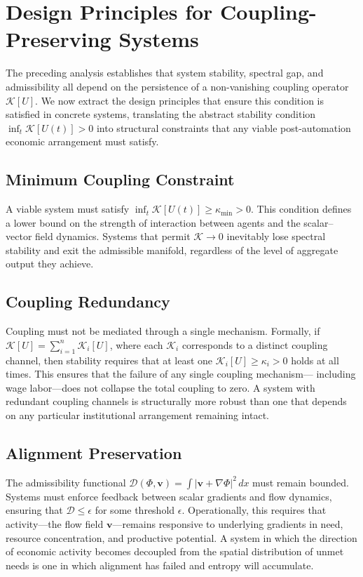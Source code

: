 \documentclass[11pt, a4paper]{article}
\theoremstyle{plain}
\theoremstyle{definition}
\newcommand{\Phifield}{\Phi}
\newcommand{\vfield}{\mathbf{v}}
\begin{document}
\section*{Design Principles for Coupling-Preserving Systems}

The preceding analysis establishes that system stability, spectral gap, and
admissibility all depend on the persistence of a non-vanishing coupling
operator $\mathcal{K}[U]$. We now extract the design principles that ensure
this condition is satisfied in concrete systems, translating the abstract
stability condition $\inf_t \mathcal{K}[U(t)] > 0$ into structural constraints
that any viable post-automation economic arrangement must satisfy.

\subsection*{Minimum Coupling Constraint}

A viable system must satisfy $\inf_{t} \mathcal{K}[U(t)] \geq \kappa_{\min} > 0$.
This condition defines a lower bound on the strength of interaction between
agents and the scalar--vector field dynamics. Systems that permit
$\mathcal{K} \to 0$ inevitably lose spectral stability and exit the
admissible manifold, regardless of the level of aggregate output they achieve.

\subsection*{Coupling Redundancy}

Coupling must not be mediated through a single mechanism. Formally, if
$\mathcal{K}[U] = \sum_{i=1}^{n} \mathcal{K}_i[U]$, where each
$\mathcal{K}_i$ corresponds to a distinct coupling channel, then stability
requires that at least one $\mathcal{K}_i[U] \geq \kappa_i > 0$ holds at
all times. This ensures that the failure of any single coupling mechanism---
including wage labor---does not collapse the total coupling to zero. A system
with redundant coupling channels is structurally more robust than one that
depends on any particular institutional arrangement remaining intact.

\subsection*{Alignment Preservation}

The admissibility functional $\mathcal{D}(\Phifield, \vfield) = \int |\vfield + \nabla \Phifield|^2\, dx$ must remain bounded. Systems must enforce feedback between scalar gradients and flow dynamics, ensuring that $\mathcal{D} \leq \epsilon$ for some threshold $\epsilon$. Operationally, this requires that activity---the flow field $\vfield$---remains responsive to underlying gradients in need, resource concentration, and productive potential. A system in which the direction of economic activity becomes decoupled from the spatial distribution of unmet needs is one in which alignment has failed and entropy will accumulate.
\end{document}
